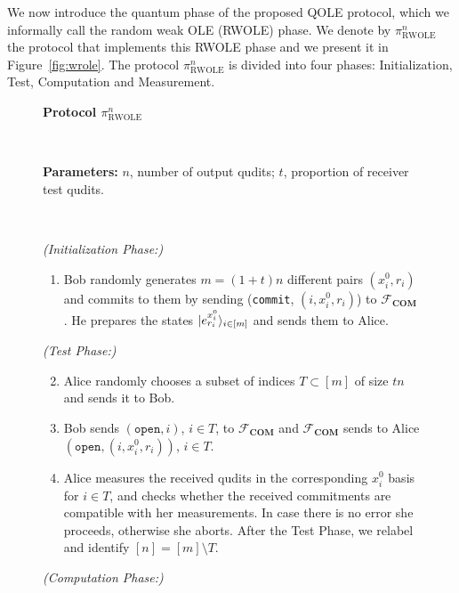 We now introduce the quantum phase of the proposed QOLE protocol, which we informally call the random weak OLE (RWOLE) phase. We denote by $\mathcal{\pi}^n_{\text{RWOLE}}$ the protocol that implements this RWOLE phase and we present it in Figure~\ref{fig:wrole}. The protocol $\mathcal{\pi}^n_{\text{RWOLE}}$ is divided into four phases: Initialization, Test, Computation and Measurement. 


\begin{figure}[h!]
    \centering
        \begin{tcolorbox}
            
            \centerline{\textbf{Protocol $\mathcal{\pi}^n_{\text{RWOLE}}$}}
            
            \
            
\textbf{Parameters:} $n$, number of output  qudits; $t$, proportion of receiver test  qudits.

    \
    
    \textit{(Initialization Phase:)}
    \begin{enumerate}
   
        \item Bob randomly generates $m = (1+t)n$ different pairs $(x^0_i, r_i)$ and commits to them by sending (\texttt{commit}, $(i, x^0_i, r_i)$) to $\mathcal{F}_{\textbf{COM}}$. He prepares the states $| e^{x^0_i}_{r_i} \rangle_{i\in [m]}$ and sends them to Alice.
        
        
    \end{enumerate}
    \textit{(Test Phase:)}
    \begin{enumerate}
    \setcounter{enumi}{1}    
        
        \item Alice randomly chooses a subset of indices $T\subset [m]$ of size $t n$ and sends it to Bob.
        
        \item Bob sends $(\texttt{open}, i)$, $i\in T$, to $\mathcal{F}_{\textbf{COM}}$ and $\mathcal{F}_{\textbf{COM}}$ sends to Alice $(\texttt{open}, (i, x^0_i, r_i))$, $i\in T$.
        
        \item Alice measures the received  qudits in the corresponding $x^0_i$ basis for $i\in T$, and checks whether the received commitments are compatible with her measurements. In case there is no error she proceeds, otherwise she aborts.
         After the Test Phase,  we relabel and identify $[n]=[m]\setminus T$.
    \end{enumerate}
    \textit{(Computation Phase:)}
    \begin{enumerate}
    \setcounter{enumi}{5}       
    

\end{enumerate}
\end{tcolorbox}
\end{figure}
